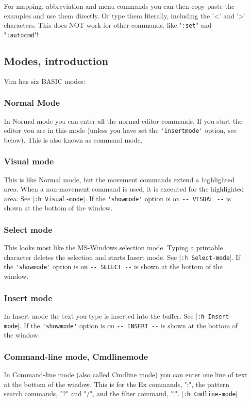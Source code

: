 For mapping, abbreviation and menu commands you can then copy-paste the examples and use them directly.
Or type them literally, including the '<' and '>' characters.
This does NOT work for other commands, like "\verb!:set!" and "\verb!:autocmd!"!

\subsection{Modes, introduction}
\label{vim-modes-intro}
\label{vim-modes}
Vim has six BASIC modes:

\subsubsection{Normal Mode}
\label{Normal}
\label{Normal-mode}
\label{command-mode}
In Normal mode you can enter all the normal editor commands.
If you start the editor you are in this mode (unless you have set the \verb!'insertmode'! option, see below).
This is also known as command mode.

\subsubsection{Visual mode}
This is like Normal mode, but the movement commands extend a highlighted area.
When a non-movement command is used, it is executed for the highlighted area.
See |\verb!:h Visual-mode!|.
If the \verb!'showmode'! option is on \verb!-- VISUAL --! is shown
at the bottom of the window.

\subsubsection{Select mode}
This looks most like the MS-Windows selection mode.
Typing a printable character deletes the selection and starts Insert mode.
See |\verb!:h Select-mode!|.
If the \verb!'showmode'! option is on \verb!-- SELECT --! is shown at the bottom of the window.

\subsubsection{Insert mode}
In Insert mode the text you type is inserted into the buffer.
See |\verb!:h Insert-mode!|.
If the \verb!'showmode'! option is on \verb!-- INSERT --! is shown at the bottom of the window.

\subsubsection{Command-line mode, Cmdlinemode}
In Command-line mode (also called Cmdline mode) you can enter one line of text at the bottom of the window.
This is for the Ex commands, ":", the pattern search commands, "?" and "/", and the filter command, "!".
|\verb!:h Cmdline-mode!|


